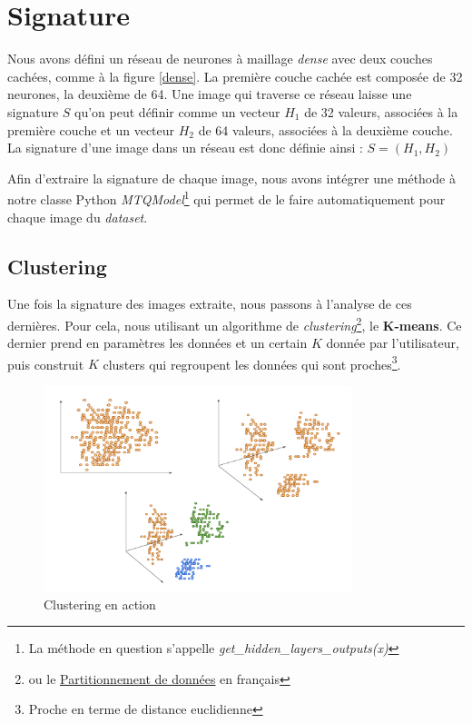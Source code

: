 \documentclass[oneside,13pt,a4paper]{report}
\begin{document}
\section{Signature}

Nous avons défini un réseau de neurones à maillage \textit{dense} avec deux couches cachées, comme à la figure \ref{dense}. La première couche cachée est composée de 32 neurones, la deuxième de 64. Une image qui traverse ce réseau laisse une signature $S$ qu'on peut définir comme un vecteur $H_1$ de 32 valeurs, associées à la première couche et un vecteur $H_2$ de 64 valeurs, associées à la deuxième couche. La signature d'une image dans un réseau est donc définie ainsi : $ S = (H_1, H_2)$

Afin d'extraire la signature de chaque image, nous avons intégrer une méthode à notre classe Python \textit{MTQModel}\footnote{La méthode en question s'appelle \textit{get\_hidden\_layers\_outputs(x)}} qui permet de le faire automatiquement pour chaque image du \textit{dataset}.

\subsection{Clustering}

Une fois la signature des images extraite, nous passons à l'analyse de ces dernières. Pour cela, nous utilisant un algorithme de \textit{clustering}\footnote{ou le \href{https://fr.wikipedia.org/wiki/Partitionnement_de_donn\%C3\%A9es}{Partitionnement de données} en français}, le \textbf{K-means}. Ce dernier prend en paramètres les données et un certain $K$ donnée par l'utilisateur, puis construit $K$ clusters qui regroupent les données qui sont proches\footnote{Proche en terme de distance euclidienne}.

\begin{figure}[!h]
\center
\includegraphics[width=0.8\textwidth]{img/kmeans.png}
\caption{Clustering en action}
\end{figure}
\end{document}
